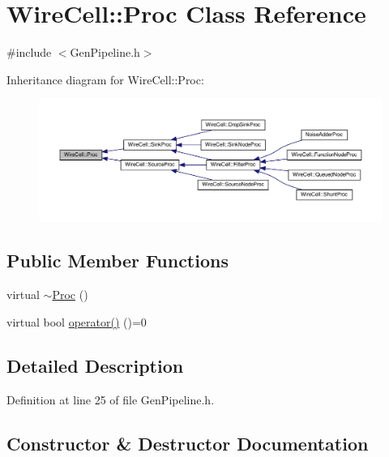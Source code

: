 \hypertarget{class_wire_cell_1_1_proc}{}\section{Wire\+Cell\+:\+:Proc Class Reference}
\label{class_wire_cell_1_1_proc}


{\ttfamily \#include $<$Gen\+Pipeline.\+h$>$}



Inheritance diagram for Wire\+Cell\+:\+:Proc\+:
\nopagebreak
\begin{figure}[H]
\begin{center}
\leavevmode
\includegraphics[width=350pt]{class_wire_cell_1_1_proc__inherit__graph}
\end{center}
\end{figure}
\subsection*{Public Member Functions}
\begin{DoxyCompactItemize}
\item 
virtual \hyperlink{class_wire_cell_1_1_proc_adde4eefd1b4566b2b40dee1a38c1b609}{$\sim$\+Proc} ()
\item 
virtual bool \hyperlink{class_wire_cell_1_1_proc_a9c642ed1f6b6741633c6cb1bd063b502}{operator()} ()=0
\end{DoxyCompactItemize}


\subsection{Detailed Description}


Definition at line 25 of file Gen\+Pipeline.\+h.



\subsection{Constructor \& Destructor Documentation}
\mbox{\label{class_wire_cell_1_1_proc_adde4eefd1b4566b2b40dee1a38c1b609}} 
